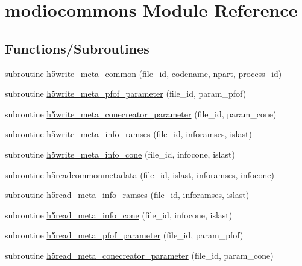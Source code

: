 \hypertarget{namespacemodiocommons}{}\section{modiocommons Module Reference}
\label{namespacemodiocommons}
\subsection*{Functions/\+Subroutines}
\begin{DoxyCompactItemize}
\item 
subroutine \hyperlink{namespacemodiocommons_a34d5806274712591a9d885c1d926af57}{h5write\+\_\+meta\+\_\+common} (file\+\_\+id, codename, npart, process\+\_\+id)
\item 
subroutine \hyperlink{namespacemodiocommons_a27eabdb687af381e608f120d19dfa997}{h5write\+\_\+meta\+\_\+pfof\+\_\+parameter} (file\+\_\+id, param\+\_\+pfof)
\item 
subroutine \hyperlink{namespacemodiocommons_a703d00d2ec9c6abb9e8bdfc19164d1f1}{h5write\+\_\+meta\+\_\+conecreator\+\_\+parameter} (file\+\_\+id, param\+\_\+cone)
\item 
subroutine \hyperlink{namespacemodiocommons_aa0393a317c75eb21189d5d381c3cf591}{h5write\+\_\+meta\+\_\+info\+\_\+ramses} (file\+\_\+id, inforamses, islast)
\item 
subroutine \hyperlink{namespacemodiocommons_afee94c7a833034224dee17e9055971e4}{h5write\+\_\+meta\+\_\+info\+\_\+cone} (file\+\_\+id, infocone, islast)
\item 
subroutine \hyperlink{namespacemodiocommons_a303306d620ca4d1ab28ec77613894994}{h5readcommonmetadata} (file\+\_\+id, islast, inforamses, infocone)
\item 
subroutine \hyperlink{namespacemodiocommons_afc9749d51b153c5440af3eda2ab6ad79}{h5read\+\_\+meta\+\_\+info\+\_\+ramses} (file\+\_\+id, inforamses, islast)
\item 
subroutine \hyperlink{namespacemodiocommons_a25748f3d836657a0319b3dd68c998cab}{h5read\+\_\+meta\+\_\+info\+\_\+cone} (file\+\_\+id, infocone, islast)
\item 
subroutine \hyperlink{namespacemodiocommons_ae46bb6ff0e0c35fd94b37c82fa3e7d7c}{h5read\+\_\+meta\+\_\+pfof\+\_\+parameter} (file\+\_\+id, param\+\_\+pfof)
\item 
subroutine \hyperlink{namespacemodiocommons_a2a3dda6a7e2900f5c81695641e65b966}{h5read\+\_\+meta\+\_\+conecreator\+\_\+parameter} (file\+\_\+id, param\+\_\+cone)
\end{DoxyCompactItemize}
